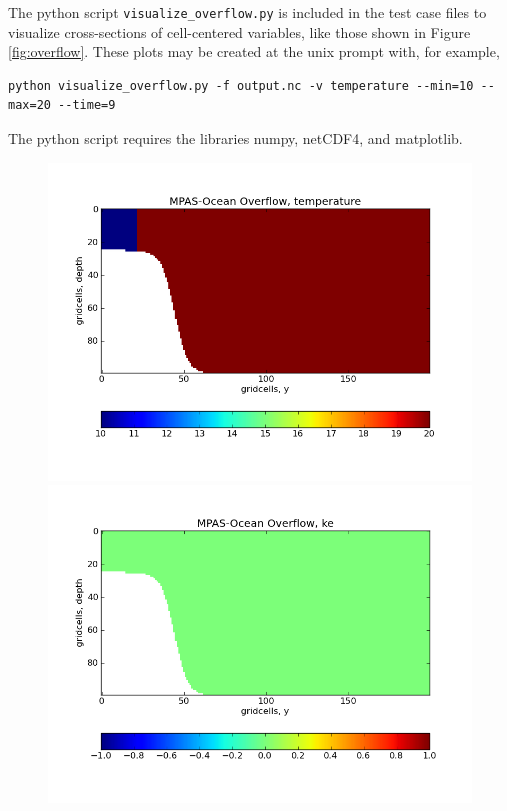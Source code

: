 The python script \verb|visualize_overflow.py| is included in the test case files to visualize cross-sections of cell-centered variables, like those shown in Figure \ref{fig:overflow}.  These plots may be created at the unix prompt with, for example,
\begin{verbatim}
python visualize_overflow.py -f output.nc -v temperature --min=10 --max=20 --time=9
\end{verbatim}
The python script requires the libraries numpy, netCDF4, and matplotlib.

\begin{figure}[H!]
	\centering
	\includegraphics[scale=0.4]{ocean/figures/MPAS-O_overflow_temperature_0hrs.png}
	\includegraphics[scale=0.4]{ocean/figures/MPAS-O_overflow_ke_0hrs.png}\\

\end{figure}
